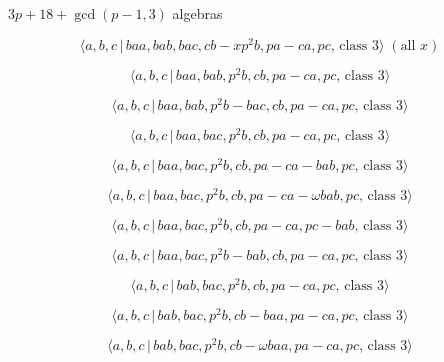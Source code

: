 \documentclass[10pt]{article}
\begin{document}
$3p+18+\gcd (p-1,3)$ algebras

\begin{equation}
\langle a,b,c\,|\,baa,bab,bac,cb-xp^2b,pa-ca,pc,\,\text{class }3\rangle \;(%
\text{all }x)  \tag{7.2907}
\end{equation}

\begin{equation}
\langle a,b,c\,|\,baa,bab,p^2b,cb,pa-ca,pc,\,\text{class }3\rangle 
\tag{7.2908}
\end{equation}

\begin{equation}
\langle a,b,c\,|\,baa,bab,p^2b-bac,cb,pa-ca,pc,\,\text{class }3\rangle 
\tag{7.2909}
\end{equation}

\begin{equation}
\langle a,b,c\,|\,baa,bac,p^2b,cb,pa-ca,pc,\,\text{class }3\rangle 
\tag{7.2910}
\end{equation}

\begin{equation}
\langle a,b,c\,|\,baa,bac,p^2b,cb,pa-ca-bab,pc,\,\text{class }3\rangle 
\tag{7.2911}
\end{equation}

\begin{equation}
\langle a,b,c\,|\,baa,bac,p^{2}b,cb,pa-ca-\omega bab,pc,\,\text{class }%
3\rangle  \tag{7.2912}
\end{equation}

\begin{equation}
\langle a,b,c\,|\,baa,bac,p^2b,cb,pa-ca,pc-bab,\,\text{class }3\rangle 
\tag{7.2913}
\end{equation}

\begin{equation}
\langle a,b,c\,|\,baa,bac,p^2b-bab,cb,pa-ca,pc,\,\text{class }3\rangle 
\tag{7.2914}
\end{equation}

\begin{equation}
\langle a,b,c\,|\,bab,bac,p^2b,cb,pa-ca,pc,\,\text{class }3\rangle 
\tag{7.2915}
\end{equation}

\begin{equation}
\langle a,b,c\,|\,bab,bac,p^2b,cb-baa,pa-ca,pc,\,\text{class }3\rangle 
\tag{7.2916}
\end{equation}

\begin{equation}
\langle a,b,c\,|\,bab,bac,p^{2}b,cb-\omega baa,pa-ca,pc,\,\text{class }%
3\rangle  \tag{7.2917}
\end{equation}
\end{document}
